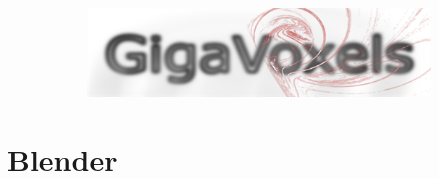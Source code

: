 \documentclass{beamer}
\begin{document}
\begin{frame}
\begin{figure}[b]
\begin{subfigure}{0.3\textwidth}
        \end{subfigure}
        ~ %
        \begin{subfigure}{0.3\textwidth}
                \includegraphics[width=\textwidth]{gigavoxelsLogo}
        \end{subfigure}    
\end{figure}

\end{frame}

\section{Blender}
\end{document}
